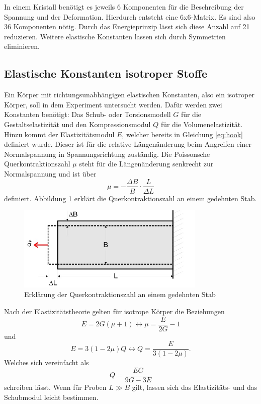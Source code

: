 In einem Kristall benötigt es jeweils 6 Komponenten für die Beschreibung der
Spannung und der Deformation. Hierdurch entsteht eine 6x6-Matrix. Es sind
also 36 Komponenten nötig. Durch das Energieprinzip lässt sich diese Anzahl auf
21 reduzieren. Weitere elastische Konstanten lassen sich durch Symmetrien
eliminieren.
\subsection{Elastische Konstanten isotroper Stoffe}
Ein Körper mit richtungsunabhängigen elastischen Konstanten, also ein isotroper
Körper, soll in dem Experiment untersucht werden. Dafür werden zwei Konstanten
benötigt:
Das Schub- oder Torsionsmodell $G$ für die Gestaltselastizität und den
Kompressionsmodul $Q$ für die Volumenelastizität. Hinzu kommt der Elastizitätsmodul
$E$, welcher bereits in Gleichung \eqref{eq:hook} definiert wurde. Dieser ist für
die relative Längenänderung beim Angreifen einer Normalspannung in
Spannungsrichtung zuständig. Die Poissonsche Querkontraktionszahl $\mu$ steht für die
Längenänderung senkrecht zur Normalspannung und ist über
\begin{equation}
  \mu = -\frac{\Delta B}{B}\cdot\frac{L}{\Delta L}
  \label{eq:qkz}
\end{equation}
definiert. Abbildung \ref{qkz} erklärt die Querkontraktionszahl an einem
gedehnten Stab.
\begin{figure}[H]
  \centering
  \includegraphics[width=0.8\textwidth]{bilder/kontraktionszahl.jpg}
  \caption{Erklärung der Querkontraktionszahl an einem gedehnten Stab \cite{102}
  }
  \label{qkz}
\end{figure}
Nach der Elastizitätstheorie gelten für isotrope Körper die Beziehungen
\begin{equation}
  E = 2 G (\mu+1)\leftrightarrow \mu=\frac{E}{2G}-1
\end{equation}
und
\begin{equation}
  E = 3(1-2\mu)Q\leftrightarrow Q=\frac{E}{3(1-2\mu)}.
\end{equation}
Welches sich vereinfacht als
\begin{equation}
  Q=\frac{EG}{9G-3E}
\end{equation}
schreiben lässt. Wenn für Proben $ L \gg B$ gilt, lassen sich das Elastizitäts-
und das Schubmodul leicht bestimmen.
\newpage
